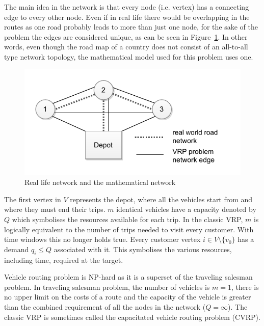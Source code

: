 The main idea in the network is that every node (i.e. vertex) has a connecting edge to every other node. Even if in real life there would be overlapping in the routes as one road probably leads to more than just one node, for the sake of the problem the edges are considered unique, as can be seen in Figure~\ref{fig:reallifenetwork}. In other words, even though the road map of a country does not consist of an all-to-all type network topology, the mathematical model used for this problem uses one. 

\begin{figure}[h]
  \begin{center}
    \includegraphics{images/simplenetwork.pdf}
    \caption{Real life network and the mathematical network}
    \label{fig:reallifenetwork}
  \end{center}
\end{figure}

The first vertex in $V$ represents the depot, where all the vehicles start from and where they must end their trips. $m$ identical vehicles have a capacity denoted by $Q$ which symbolises the resources available for each trip. In the classic VRP, $m$ is logically equivalent to the number of trips needed to visit every customer. With time windows this no longer holds true. Every customer vertex $i \in V\setminus\{v_0\}$ has a demand $q_i \leq Q$ associated with it. This symbolises the various resources, including time, required at the target. \cite{laporte2007you}

Vehicle routing problem is NP-hard as it is a superset of the traveling salesman problem. In traveling salesman problem, the number of vehicles is $m = 1$, there is no upper limit on the costs of a route and the capacity of the vehicle is greater than the combined requirement of all the nodes in the network ($Q = \infty$). \cite{laporte2007you} The classic VRP is sometimes called the capacitated vehicle routing problem (CVRP). \cite{hassanzadeh2009location}

